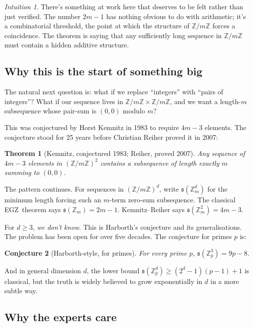 \documentclass[11pt,a4paper]{article}
\theoremstyle{plain}
\newtheorem{theorem}{Theorem}[section]
\newtheorem{conjecture}[theorem]{Conjecture}
\theoremstyle{definition}
\theoremstyle{remark}
\newtheorem*{intuition}{Intuition}
\newcommand{\Z}{\mathbb{Z}}
\newcommand{\sUFp}{\mathfrak{s}}
\newcommand{\EGZ}{\textsf{EGZ}}
\begin{document}
\begin{intuition}
There's something at work here that deserves to be felt rather than just verified. The number $2m - 1$ has nothing obvious to do with arithmetic; it's a combinatorial threshold, the point at which the structure of $\Z/m\Z$ forces a coincidence. The theorem is saying that any sufficiently long sequence in $\Z/m\Z$ must contain a hidden additive structure.
\end{intuition}

\subsection{Why this is the start of something big}

The natural next question is: what if we replace ``integers'' with ``pairs of integers''? What if our sequence lives in $\Z/m\Z \times \Z/m\Z$, and we want a length-$m$ subsequence whose pair-sum is $(0, 0)$ modulo $m$?

This was conjectured by Horst Kemnitz in 1983 to require $4m - 3$ elements. The conjecture stood for 25 years before Christian Reiher proved it in 2007:

\begin{theorem}[Kemnitz, conjectured 1983; Reiher, proved 2007]
\label{thm:kemnitz}
Any sequence of $4m - 3$ elements in $(\Z/m\Z)^2$ contains a subsequence of length exactly $m$ summing to $(0, 0)$.
\end{theorem}

The pattern continues. For sequences in $(\Z/m\Z)^d$, write $\sUFp(\Z_m^d)$ for the minimum length forcing such an $m$-term zero-sum subsequence. The classical \EGZ\ theorem says $\sUFp(\Z_m) = 2m - 1$. Kemnitz--Reiher says $\sUFp(\Z_m^2) = 4m - 3$.

For $d \geq 3$, \emph{we don't know}. This is Harborth's conjecture and its generalisations. The problem has been open for over five decades. The conjecture for primes $p$ is:

\begin{conjecture}[Harborth-style, for primes]
\label{conj:harborth}
For every prime $p$, $\sUFp(\Z_p^3) = 9p - 8$.
\end{conjecture}

And in general dimension $d$, the lower bound $\sUFp(\Z_p^d) \geq (2^d - 1)(p - 1) + 1$ is classical, but the truth is widely believed to grow exponentially in $d$ in a more subtle way.

\subsection{Why the experts care}
\end{document}
